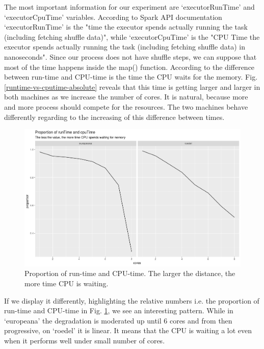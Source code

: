 The most important information for our experiment are `executorRunTime' and `executorCpuTime' variables. According to Spark API documentation \cite{spark-taskmetrics} `executorRunTime' is the "time the executor spends actually running the task (including fetching shuffle data)", while `executorCpuTime' is the "CPU Time the executor spends actually running the task (including fetching shuffle data) in nanoseconds". Since our process does not have shuffle steps, we can suppose that most of the time happens inside the map() function. According to \cite{canali2017} the difference between run-time and CPU-time is the time the CPU waits for the memory. Fig. \ref{runtime-vs-cputime-absolute} reveals that this time is getting larger and larger in both machines as we increase the number of cores. It is natural, because more and more process should compete for the resources. The two machines behave differently regarding to the increasing of this difference between times.

\begin{figure}
\includegraphics[width=\textwidth]{images/chapter06/runtime-vs-cputime.png}
\caption{Proportion of run-time and CPU-time. The larger the distance, the more time CPU is waiting.}
\label{runtime-vs-cputime}
\end{figure}

If we display it differently, highlighting the relative numbers i.e. the proportion of run-time and CPU-time in Fig. \ref{runtime-vs-cputime}, we see an interesting pattern. While in `europeana' the degradation is moderated up until 6 cores and from then progressive, on `roedel' it is linear. It means that the CPU is waiting a lot even when it performs well under small number of cores.


